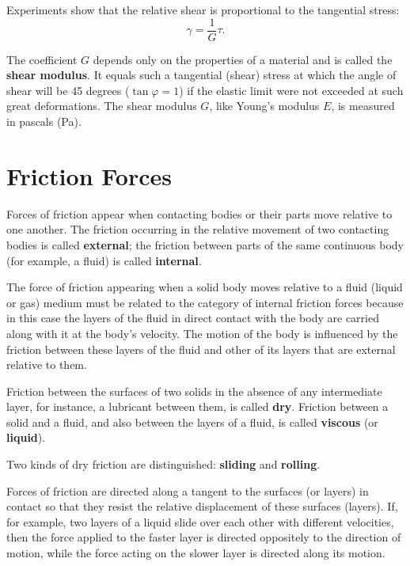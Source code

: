 Experiments show that the relative shear is proportional to the tangential stress:
\begin{equation}\label{eq:2_34}
\gamma = \frac{1}{G}\tau.
\end{equation}

\noindent
The coefficient $G$ depends only on the properties of a material and is called the \textbf{shear modulus}. It equals such a tangential (shear) stress at which the angle of shear will be 45 degrees ($\tan\varphi=1$) if the elastic limit were not exceeded at such great deformations. The shear modulus $G$, like Young's modulus $E$, is measured in pascals (\si{\pascal}).

\section{Friction Forces}\label{sec:2_10}

Forces of friction appear when contacting bodies or their parts move relative to one another. The friction occurring in the relative movement of two contacting bodies is called \textbf{external}; the friction between parts of the same continuous body (for example, a fluid) is called \textbf{internal}.

The force of friction appearing when a solid body moves relative to a fluid (liquid or gas) medium must be related to the category of internal friction forces because in this case the layers of the fluid in direct contact with the body are carried along with it at the body's velocity. The motion of the body is influenced by the friction between these layers of the fluid and other of its layers that are external relative to them.

Friction between the surfaces of two solids in the absence of any intermediate layer, for instance, a lubricant between them, is called \textbf{dry}. Friction between a solid and a fluid, and also between the layers of a fluid, is called \textbf{viscous} (or \textbf{liquid}).

Two kinds of dry friction are distinguished: \textbf{sliding} and \textbf{rolling}.

Forces of friction are directed along a tangent to the surfaces (or layers) in contact so that they resist the relative displacement of these surfaces (layers). If, for example, two layers of a liquid slide over each other with different velocities, then the force applied to the faster layer is directed oppositely to the direction of motion, while the force acting on the slower layer is directed along its motion.


